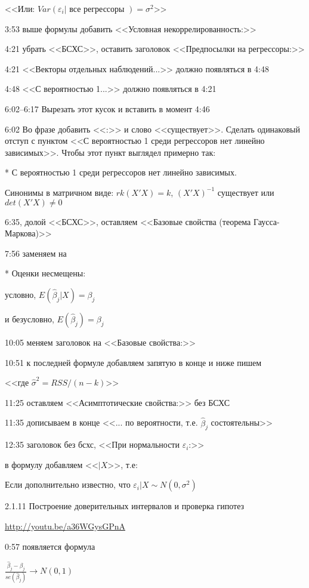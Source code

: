 \documentclass[12pt,a4paper]{article}
\begin{document}
<<Или: $Var(\varepsilon_i | \text{  все регрессоры })=\sigma^2$>>

3:53 выше формулы добавить <<Условная некоррелированность:>>

4:21 убрать <<БСХС>>, оставить заголовок <<Предпосылки на регрессоры:>>

4:21 <<Векторы отдельных наблюдений...>> должно появляться в 4:48

4:48 <<С вероятностью 1...>> должно появляться в 4:21

6:02--6:17   Вырезать этот кусок и вставить в момент 4:46

6:02 Во фразе добавить <<:>> и слово <<существует>>. Сделать одинаковый отступ с пунктом <<С вероятностью 1 среди регрессоров нет линейно зависимых>>. Чтобы  этот пункт выглядел примерно так:

* С вероятностью 1 среди регрессоров нет линейно зависимых.

  Синонимы в матричном виде: $rk(X'X)=k$, $(X'X)^{-1}$ существует или $det(X'X)\neq 0$
  
  
6:35, долой <<БСХС>>, оставляем <<Базовые свойства (теорема Гаусса-Маркова)>>

7:56 заменяем на 

* Оценки несмещены:

условно, $E(\hat{\beta}_j |X)=\beta_j$

и безусловно, $E(\hat{\beta}_j)=\beta_j$

10:05 меняем заголовок на <<Базовые свойства:>>

10:51 к последней формуле добавляем запятую в конце и ниже пишем

<<где $\hat{\sigma}^2=RSS/(n-k)$>>

11:25 оставляем <<Асимптотические свойства:>> без БСХС

11:35 дописываем в конце <<... по вероятности, т.е. $\hat{\beta}_j$ состоятельны>>

12:35 заголовок без бсхс, <<При нормальности $\varepsilon_i$:>>

в формулу добавляем <<$|X$>>, т.е:

Если дополнительно известно, что $\varepsilon_i | X \sim N(0,\sigma^2)$


2.1.11 Построение доверительных интервалов и проверка гипотез

\url{http://youtu.be/a36WGysGPnA}

0:57 появляется формула 

$\frac{\hat{\beta}_j-\beta_j}{se(\hat{\beta}_j)} \to N(0,1)$
\end{document}
